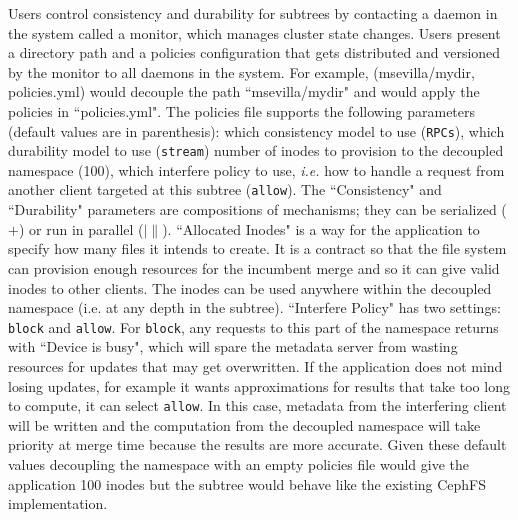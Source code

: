 Users control consistency and durability for subtrees by contacting a daemon in
the system called a monitor, which manages cluster state changes.  Users
present a directory path and a policies configuration that gets distributed and
versioned by the monitor to all daemons in the system. For example,
(msevilla/mydir, policies.yml) would decouple the path ``msevilla/mydir" and
would apply the policies in ``policies.yml".  The policies file supports the
following parameters (default values are in parenthesis): which consistency
model to use (\texttt{RPCs}), which durability model to use (\texttt{stream})
number of inodes to provision to the decoupled namespace (100), which interfere
policy to use, {\it i.e.} how to handle a request from another client
targeted at this subtree (\texttt{allow}). The ``Consistency" and ``Durability"
parameters are compositions of mechanisms; they can be serialized (\(+\)) or
run in parallel (\(|\|\)).  ``Allocated Inodes" is a way for the application to
specify how many files it intends to create. It is a contract so that the file
system can provision enough resources for the incumbent merge and so it can
give valid inodes to other clients. The inodes can be used anywhere within the
decoupled namespace ({i.e.} at any depth in the subtree).  ``Interfere Policy"
has two settings: \texttt{block} and \texttt{allow}.  For \texttt{block}, any
requests to this part of the namespace returns with ``Device is busy", which
will spare the metadata server from wasting resources for updates that may get
overwritten. If the application does not mind losing updates, for example it
wants approximations for results that take too long to compute, it can select
\texttt{allow}. In this case, metadata from the interfering client will be
written and the computation from the decoupled namespace will take priority at
merge time because the results are more accurate.  Given these default values
decoupling the namespace with an empty policies file would give the application
100 inodes but the subtree would behave like the existing CephFS
implementation.  
